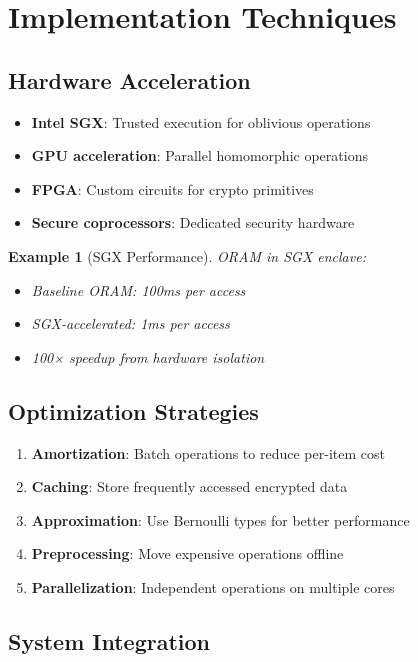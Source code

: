 \documentclass[11pt,final]{article}
\newtheorem{example}[theorem]{Example}
\begin{document}
\section{Implementation Techniques}

\subsection{Hardware Acceleration}

\begin{itemize}
    \item \textbf{Intel SGX}: Trusted execution for oblivious operations
    \item \textbf{GPU acceleration}: Parallel homomorphic operations
    \item \textbf{FPGA}: Custom circuits for crypto primitives
    \item \textbf{Secure coprocessors}: Dedicated security hardware
\end{itemize}

\begin{example}[SGX Performance]
ORAM in SGX enclave:
\begin{itemize}
    \item Baseline ORAM: 100ms per access
    \item SGX-accelerated: 1ms per access
    \item 100× speedup from hardware isolation
\end{itemize}
\end{example}

\subsection{Optimization Strategies}

\begin{enumerate}
    \item \textbf{Amortization}: Batch operations to reduce per-item cost
    \item \textbf{Caching}: Store frequently accessed encrypted data
    \item \textbf{Approximation}: Use Bernoulli types for better performance
    \item \textbf{Preprocessing}: Move expensive operations offline
    \item \textbf{Parallelization}: Independent operations on multiple cores
\end{enumerate}

\subsection{System Integration}
\end{document}
